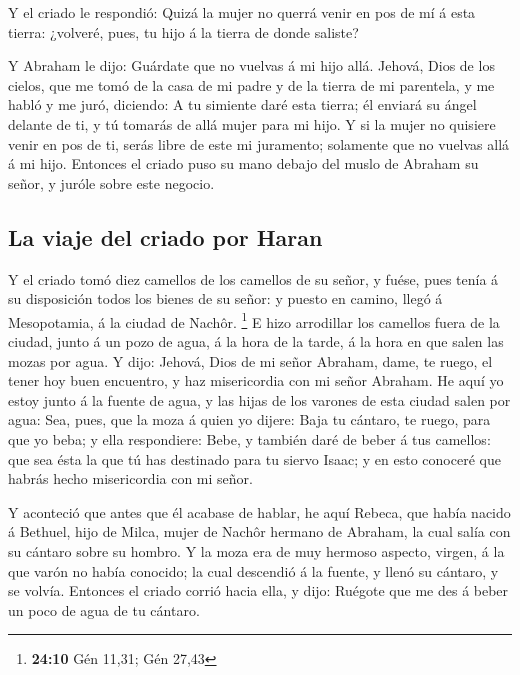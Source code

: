  Y el criado le respondió: Quizá la mujer no querrá venir
en pos de mí á esta tierra: ¿volveré, pues, tu hijo á la tierra de donde
saliste?

 Y Abraham le dijo: Guárdate que no vuelvas á mi hijo
allá.  Jehová, Dios de los cielos, que me tomó de la casa
de mi padre y de la tierra de mi parentela, y me habló y me juró,
diciendo: A tu simiente daré esta tierra; él enviará su ángel delante de
ti, y tú tomarás de allá mujer para mi hijo.  Y si la
mujer no quisiere venir en pos de ti, serás libre de este mi juramento;
solamente que no vuelvas allá á mi hijo.  Entonces el
criado puso su mano debajo del muslo de Abraham su señor, y juróle sobre
este negocio.

\hypertarget{la-viaje-del-criado-por-haran}{%
\subsection{La viaje del criado por
Haran}\label{la-viaje-del-criado-por-haran}}

 Y el criado tomó diez camellos de los camellos de su
señor, y fuése, pues tenía á su disposición todos los bienes de su
señor: y puesto en camino, llegó á Mesopotamia, á la ciudad de Nachôr.
\footnote{\textbf{24:10} Gén 11,31; Gén 27,43}  E hizo
arrodillar los camellos fuera de la ciudad, junto á un pozo de agua, á
la hora de la tarde, á la hora en que salen las mozas por agua.
 Y dijo: Jehová, Dios de mi señor Abraham, dame, te
ruego, el tener hoy buen encuentro, y haz misericordia con mi señor
Abraham.  He aquí yo estoy junto á la fuente de agua, y
las hijas de los varones de esta ciudad salen por agua: 
Sea, pues, que la moza á quien yo dijere: Baja tu cántaro, te ruego,
para que yo beba; y ella respondiere: Bebe, y también daré de beber á
tus camellos: que sea ésta la que tú has destinado para tu siervo Isaac;
y en esto conoceré que habrás hecho misericordia con mi señor.

 Y aconteció que antes que él acabase de hablar, he aquí
Rebeca, que había nacido á Bethuel, hijo de Milca, mujer de Nachôr
hermano de Abraham, la cual salía con su cántaro sobre su hombro.
 Y la moza era de muy hermoso aspecto, virgen, á la que
varón no había conocido; la cual descendió á la fuente, y llenó su
cántaro, y se volvía.  Entonces el criado corrió hacia
ella, y dijo: Ruégote que me des á beber un poco de agua de tu cántaro.

